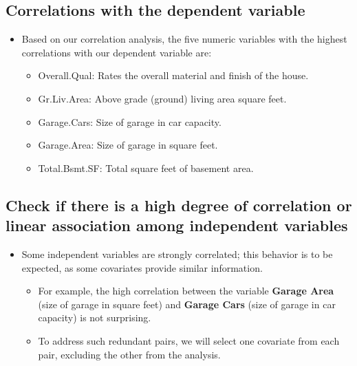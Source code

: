 \documentclass[aoas]{imsart}
\providecommand{\tightlist}{%
  \setlength{\itemsep}{0pt}\setlength{\parskip}{0pt}}
\numberwithin{equation}{section}
\theoremstyle{plain}
\theoremstyle{remark}
\begin{document}
\hypertarget{correlations-with-the-dependent-variable}{%
\subsection{Correlations with the dependent
variable}\label{correlations-with-the-dependent-variable}}

\begin{itemize}
\tightlist
\item
  Based on our correlation analysis, the five numeric variables with the
  highest correlations with our dependent variable are: \vspace{0.2cm}

  \begin{itemize}
  \tightlist
  \item
    Overall.Qual: Rates the overall material and finish of the house.
  \item
    Gr.Liv.Area: Above grade (ground) living area square feet.
  \item
    Garage.Cars: Size of garage in car capacity.
  \item
    Garage.Area: Size of garage in square feet.
  \item
    Total.Bsmt.SF: Total square feet of basement area.
  \end{itemize}
\end{itemize}

\hypertarget{check-if-there-is-a-high-degree-of-correlation-or-linear-association-among-independent-variables}{%
\subsection{Check if there is a high degree of correlation or linear
association among independent
variables}\label{check-if-there-is-a-high-degree-of-correlation-or-linear-association-among-independent-variables}}

\begin{itemize}
\tightlist
\item
  Some independent variables are strongly correlated; this behavior is
  to be expected, as some covariates provide similar information.
  \vspace{0.2cm}

  \begin{itemize}
  \tightlist
  \item
    For example, the high correlation between the variable
    \textbf{Garage Area} (size of garage in square feet) and
    \textbf{Garage Cars} (size of garage in car capacity) is not
    surprising.
  \item
    To address such redundant pairs, we will select one covariate from
    each pair, excluding the other from the analysis.
  \end{itemize}
\end{itemize}
\end{document}
